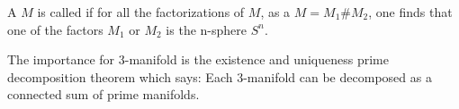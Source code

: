 \documentclass[12pt]{article}
\begin{document}
A  $M$ is called  if for all the factorizations of $M$, as a  $M=M_1\#M_2$, one finds that one of the factors $M_1$ or $M_2$ is the n-sphere $S^n$. 

The importance for 3-manifold is the existence and uniqueness prime decomposition theorem which says: Each 3-manifold can be decomposed as a connected sum of prime manifolds. 
\end{document}
